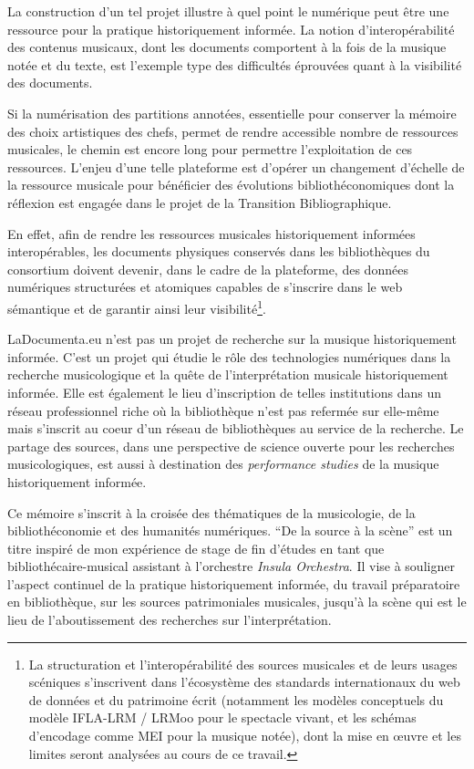 \bigskip La construction d’un tel projet illustre à quel point le numérique peut être une ressource pour la pratique historiquement informée. La notion d'interopérabilité des contenus musicaux, dont les documents comportent à la fois de la musique notée et du texte, est l'exemple type des difficultés éprouvées quant à la visibilité des documents.

\smallskip\indent Si la numérisation des partitions annotées, essentielle pour conserver la mémoire des choix artistiques des chefs, permet de rendre accessible nombre de ressources musicales, le chemin est encore long pour permettre l'exploitation de ces ressources. L'enjeu d'une telle plateforme est d'opérer un changement d'échelle de la ressource musicale pour bénéficier des évolutions bibliothéconomiques dont la réflexion est engagée dans le projet de la Transition Bibliographique.

\smallskip\indent En effet, afin de rendre les ressources musicales historiquement informées interopérables, les documents physiques conservés dans les bibliothèques du consortium doivent devenir, dans le cadre de la plateforme, des données numériques structurées et atomiques capables de s'inscrire dans le web sémantique et de garantir ainsi leur visibilité\footnote{La structuration et l'interopérabilité des sources musicales et de leurs usages scéniques s'inscrivent dans l'écosystème des standards internationaux du web de données et du patrimoine écrit (notamment les modèles conceptuels du modèle IFLA-LRM / LRMoo pour le spectacle vivant, et les schémas d'encodage comme MEI pour la musique notée), dont la mise en œuvre et les limites seront analysées au cours de ce travail.}.

\bigskip LaDocumenta.eu n'est pas un projet de recherche sur la musique historiquement informée. C'est un projet qui étudie le rôle des technologies numériques dans la recherche musicologique et la quête de l'interprétation musicale historiquement informée. Elle est également le lieu d'inscription de telles institutions dans un réseau professionnel riche où la bibliothèque n'est pas refermée sur elle-même mais s'inscrit au coeur d'un réseau de bibliothèques au service de la recherche. Le partage des sources, dans une perspective de science ouverte pour les recherches musicologiques, est aussi à destination des \textit{performance studies} de la musique historiquement informée.

\bigskip Ce mémoire s'inscrit à la croisée des thématiques de la musicologie, de la bibliothéconomie et des humanités numériques. \enquote{De la source à la scène} est un titre inspiré de mon expérience de stage de fin d'études en tant que bibliothécaire-musical assistant à l'orchestre \textit{Insula Orchestra}. Il vise à souligner l’aspect continuel de la pratique historiquement informée, du travail préparatoire en bibliothèque, sur les sources patrimoniales musicales, jusqu’à la scène qui est le lieu de l’aboutissement des recherches sur l’interprétation.

